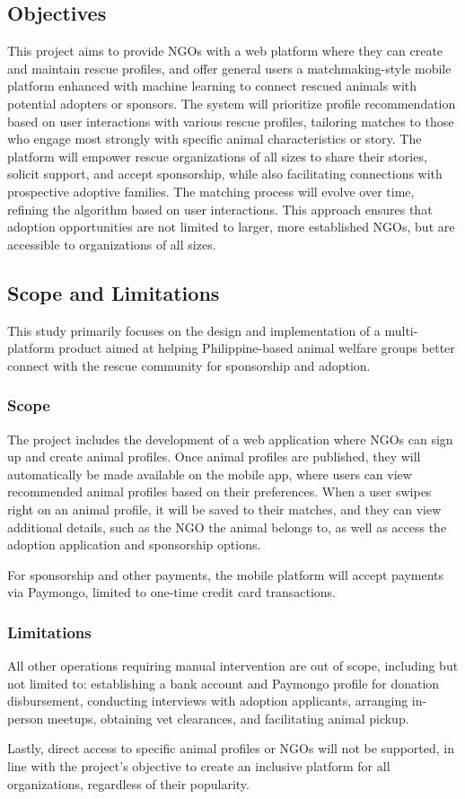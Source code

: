             


    \subsection{Objectives}
    
        This project aims to provide NGOs with a web platform where they can create and maintain rescue profiles, and offer general users a matchmaking-style mobile platform enhanced with machine learning to connect rescued animals with potential adopters or sponsors. The system will prioritize profile recommendation based on user interactions with various rescue profiles, tailoring matches to those who engage most strongly with specific animal characteristics or story. The platform will empower rescue organizations of all sizes to share their stories, solicit support, and accept sponsorship, while also facilitating connections with prospective adoptive families. The matching process will evolve over time, refining the algorithm based on user interactions. This approach ensures that adoption opportunities are not limited to larger, more established NGOs, but are accessible to organizations of all sizes.
        
    \subsection{Scope and Limitations}
        This study primarily focuses on the design and implementation of a multi-platform product aimed at helping Philippine-based animal welfare groups better connect with the rescue community for sponsorship and adoption.
        \subsubsection{Scope}
             The project includes the development of a web application where NGOs can sign up and create animal profiles. Once animal profiles are published, they will automatically be made available on the mobile app, where users can view recommended animal profiles based on their preferences. When a user swipes right on an animal profile, it will be saved to their matches, and they can view additional details, such as the NGO the animal belongs to, as well as access the adoption application and sponsorship options.
             
             For sponsorship and other payments, the mobile platform will accept payments via Paymongo, limited to one-time credit card transactions.
        \subsubsection{Limitations}
            All other operations requiring manual intervention are out of scope, including but not limited to: establishing a bank account and Paymongo profile for donation disbursement, conducting interviews with adoption applicants, arranging in-person meetups, obtaining vet clearances, and facilitating animal pickup.

            Lastly, direct access to specific animal profiles or NGOs will not be supported, in line with the project’s objective to create an inclusive platform for all organizations, regardless of their popularity.
